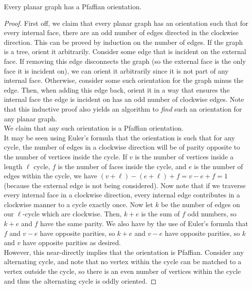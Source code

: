 


\begin{ftheo}
	Every planar graph has a Pfaffian orientation.
\end{ftheo}
\begin{proof}
	First off, we claim that every planar graph has an orientation such that for every internal face, there are an odd number of edges directed in the clockwise direction. This can be proved by induction on the number of edges. If the graph is a tree, orient it arbitrarily. Consider some edge that is incident on the external face. If removing this edge disconnects the graph (so the external face is the only face it is incident on), we can orient it arbitrarily since it is not part of any internal face. Otherwise, consider some such orientation for the graph minus the edge. Then, when adding this edge back, orient it in a way that ensures the internal face the edge is incident on has an odd number of clockwise edges. Note that this inductive proof also yields an algorithm to \emph{find} such an orientation for any planar graph.\\
	We claim that any such orientation is a Pfaffian orientation.\\
	It may be seen using Euler's formula that the orientation is such that for any cycle, the number of edges in a clockwise direction will be of parity opposite to the number of vertices inside the cycle. If $v$ is the number of vertices inside a length $\ell$ cycle, $f$ is the number of faces inside the cycle, and $e$ is the number of edges within the cycle, we have $(v+\ell)-(e+\ell)+f = v-e+f = 1$ (because the external edge is not being considered). Now note that if we traverse every internal face in a clockwise direction, every internal edge contributes in a clockwise manner to a cycle exactly once. Now let $k$ be the number of edges on our $\ell$-cycle which are clockwise. Then, $k+e$ is the sum of $f$ odd numbers, so $k+e$ and $f$ have the same parity. We also have by the use of Euler's formula that $f$ and $v-e$ have opposite parities, so $k+e$ and $v-e$ have opposite parities, so $k$ and $v$ have opposite parities as desired. \\
	However, this near-directly implies that the orientation is Pfaffian. Consider any alternating cycle, and note that no vertex within the cycle can be matched to a vertex outside the cycle, so there is an even number of vertices within the cycle and thus the alternating cycle is oddly oriented.
\end{proof}

